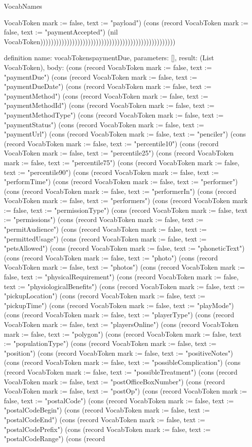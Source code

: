 \begin{lexlean}{VocabNames}
\begin{semanticmodule}
{VocabToken {mark := false, text := "payload"}) (cons (record VocabToken {mark := false, text := "paymentAccepted"}) (nil VocabToken)))))))))))))))))))))))))))))))))))))))))))))))))))
}

definition{
  name: vocabTokenspaymentDue,
  parameters: [],
  result: (List VocabToken),
  body: (cons (record VocabToken {mark := false, text := "paymentDue"}) (cons (record VocabToken {mark := false, text := "paymentDueDate"}) (cons (record VocabToken {mark := false, text := "paymentMethod"}) (cons (record VocabToken {mark := false, text := "paymentMethodId"}) (cons (record VocabToken {mark := false, text := "paymentMethodType"}) (cons (record VocabToken {mark := false, text := "paymentStatus"}) (cons (record VocabToken {mark := false, text := "paymentUrl"}) (cons (record VocabToken {mark := false, text := "penciler"}) (cons (record VocabToken {mark := false, text := "percentile10"}) (cons (record VocabToken {mark := false, text := "percentile25"}) (cons (record VocabToken {mark := false, text := "percentile75"}) (cons (record VocabToken {mark := false, text := "percentile90"}) (cons (record VocabToken {mark := false, text := "performTime"}) (cons (record VocabToken {mark := false, text := "performer"}) (cons (record VocabToken {mark := false, text := "performerIn"}) (cons (record VocabToken {mark := false, text := "performers"}) (cons (record VocabToken {mark := false, text := "permissionType"}) (cons (record VocabToken {mark := false, text := "permissions"}) (cons (record VocabToken {mark := false, text := "permitAudience"}) (cons (record VocabToken {mark := false, text := "permittedUsage"}) (cons (record VocabToken {mark := false, text := "petsAllowed"}) (cons (record VocabToken {mark := false, text := "phoneticText"}) (cons (record VocabToken {mark := false, text := "photo"}) (cons (record VocabToken {mark := false, text := "photos"}) (cons (record VocabToken {mark := false, text := "physicalRequirement"}) (cons (record VocabToken {mark := false, text := "physiologicalBenefits"}) (cons (record VocabToken {mark := false, text := "pickupLocation"}) (cons (record VocabToken {mark := false, text := "pickupTime"}) (cons (record VocabToken {mark := false, text := "playMode"}) (cons (record VocabToken {mark := false, text := "playerType"}) (cons (record VocabToken {mark := false, text := "playersOnline"}) (cons (record VocabToken {mark := false, text := "polygon"}) (cons (record VocabToken {mark := false, text := "populationType"}) (cons (record VocabToken {mark := false, text := "position"}) (cons (record VocabToken {mark := false, text := "positiveNotes"}) (cons (record VocabToken {mark := false, text := "possibleComplication"}) (cons (record VocabToken {mark := false, text := "possibleTreatment"}) (cons (record VocabToken {mark := false, text := "postOfficeBoxNumber"}) (cons (record VocabToken {mark := false, text := "postOp"}) (cons (record VocabToken {mark := false, text := "postalCode"}) (cons (record VocabToken {mark := false, text := "postalCodeBegin"}) (cons (record VocabToken {mark := false, text := "postalCodeEnd"}) (cons (record VocabToken {mark := false, text := "postalCodePrefix"}) (cons (record VocabToken {mark := false, text := "postalCodeRange"}) (cons (record }
\end{semanticmodule}
\end{lexlean}
